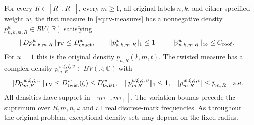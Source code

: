 \begin{theorem}
\label{thm:rv-exact-bv}
For every $R\in[R_-,R_+]$, every $m\ge1$, all original labels
$n,k$, and either specified weight $w$, the first measure in
\eqref{eq:rv-measures} has a nonnegative density
$p_{n,k,m,R}^{w}\in BV(\mathbb R)$ satisfying
\begin{equation}\label{eq:rv-exact-bv}
 \|Dp_{n,k,m,R}^{w}\|_{\rm TV}\le D_{\rm exact}^{w},
 \qquad \|p_{n,k,m,R}^{w}\|_1\le1,
 \qquad \|p_{n,k,m,R}^{w}\|_\infty\le C_{\rm roof}.
\end{equation}
For $w=1$ this is the original density $p_{n,R}(k,m,t)$.
The twisted measure has a complex density
$p_{m,R}^{w;\xi,\zeta,\upsilon}\in BV(\mathbb R;\mathbb C)$
with
\begin{equation}\label{eq:rv-twist-bv}
 \|Dp_{m,R}^{w;\xi,\zeta,\upsilon}\|_{\rm TV}
                         \le D_{\rm twist}^{w}(\zeta)
                         \le D_{\rm twist}^{w},
 \quad \|p_{m,R}^{w;\xi,\zeta,\upsilon}\|_1\le1,
 \quad |p_{m,R}^{w;\xi,\zeta,\upsilon}|
                         \le\overline p_{m,R}\quad\hbox{a.e.}
\end{equation}
All densities have support in $[m\tau_-,m\tau_+]$. The
variation bounds precede the supremum over $R,m,n,k$ and all real
discrete-mark frequencies. As throughout the original problem,
exceptional density sets may depend on the fixed radius.
\end{theorem}
